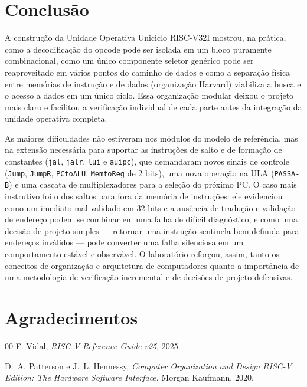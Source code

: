 \documentclass[conference]{IEEEtran}
\begin{document}
\section{Conclusão}
A construção da Unidade Operativa Uniciclo RISC-V32I mostrou, na prática, como a decodificação do opcode
pode ser isolada em um bloco puramente combinacional, como um único componente seletor genérico pode ser
reaproveitado em vários pontos do caminho de dados e como a separação física entre memórias de instrução e
de dados (organização Harvard) viabiliza a busca e o acesso a dados em um único ciclo. Essa organização
modular deixou o projeto mais claro e facilitou a verificação individual de cada parte antes da integração
da unidade operativa completa.

As maiores dificuldades não estiveram nos módulos do modelo de referência, mas na extensão necessária para
suportar as instruções de salto e de formação de constantes (\texttt{jal}, \texttt{jalr}, \texttt{lui} e
\texttt{auipc}), que demandaram novos sinais de controle (\texttt{Jump}, \texttt{JumpR}, \texttt{PCtoALU},
\texttt{MemtoReg} de 2 bits), uma nova operação na ULA (\texttt{PASSA-B}) e uma cascata de multiplexadores
para a seleção do próximo PC. O caso mais instrutivo foi o dos saltos para fora da memória de instruções:
ele evidenciou como um imediato mal validado em 32 bits e a ausência de tradução e validação de endereço
podem se combinar em uma falha de difícil diagnóstico, e como uma decisão de projeto simples — retornar uma
instrução sentinela bem definida para endereços inválidos — pode converter uma falha silenciosa em um
comportamento estável e observável. O laboratório reforçou, assim, tanto os conceitos de organização e
arquitetura de computadores quanto a importância de uma metodologia de verificação incremental e de
decisões de projeto defensivas.

\section*{Agradecimentos}



\begin{thebibliography}{00}
F. Vidal,
\textit{RISC-V Reference Guide v25}, 2025.

D.~A. Patterson e J.~L. Hennessy,
\textit{Computer Organization and Design RISC-V Edition: The Hardware Software Interface}.
Morgan Kaufmann, 2020.

\end{thebibliography}
\end{document}
